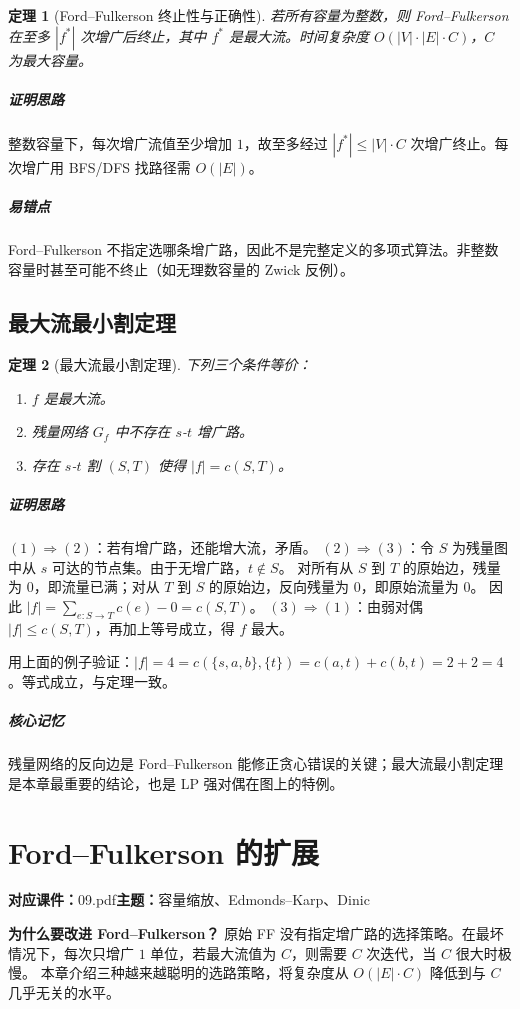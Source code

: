 \documentclass[UTF8,openany,12pt]{ctexbook}
\newtheorem{theorem}{定理}[chapter]
\theoremstyle{remark}
\newcommand{\lecture}[3]{
  \chapter{#2}
  \noindent\textbf{对应课件：}#1\hfill\textbf{主题：}#3
  \vspace{0.6em}
}
\newcommand{\keypoint}[1]{\paragraph{核心记忆}#1}
\newcommand{\proofidea}[1]{\paragraph{证明思路}#1}
\newcommand{\pitfall}[1]{\paragraph{易错点}#1}
\begin{document}
\begin{theorem}[Ford--Fulkerson 终止性与正确性]
若所有容量为整数，则 Ford--Fulkerson 在至多 $|f^*|$ 次增广后终止，其中 $f^*$ 是最大流。时间复杂度 $O(|V|\cdot|E|\cdot C)$，$C$ 为最大容量。
\end{theorem}
\proofidea{整数容量下，每次增广流值至少增加 $1$，故至多经过 $|f^*|\le |V|\cdot C$ 次增广终止。每次增广用 BFS/DFS 找路径需 $O(|E|)$。}

\pitfall{Ford--Fulkerson 不指定选哪条增广路，因此不是完整定义的多项式算法。非整数容量时甚至可能不终止（如无理数容量的 Zwick 反例）。}

\section{最大流最小割定理}

\begin{theorem}[最大流最小割定理]
下列三个条件等价：
\begin{enumerate}
  \item $f$ 是最大流。
  \item 残量网络 $G_f$ 中不存在 $s$-$t$ 增广路。
  \item 存在 $s$-$t$ 割 $(S,T)$ 使得 $|f|=c(S,T)$。
\end{enumerate}
\end{theorem}

\proofidea{
$(1)\Rightarrow(2)$：若有增广路，还能增大流，矛盾。
$(2)\Rightarrow(3)$：令 $S$ 为残量图中从 $s$ 可达的节点集。由于无增广路，$t\notin S$。
对所有从 $S$ 到 $T$ 的原始边，残量为 $0$，即流量已满；对从 $T$ 到 $S$ 的原始边，反向残量为 $0$，即原始流量为 $0$。
因此 $|f|=\sum_{e: S\to T}c(e)-0=c(S,T)$。
$(3)\Rightarrow(1)$：由弱对偶 $|f|\le c(S,T)$，再加上等号成立，得 $f$ 最大。
}

\noindent 用上面的例子验证：$|f|=4=c(\{s,a,b\},\{t\})=c(a,t)+c(b,t)=2+2=4$。等式成立，与定理一致。

\keypoint{残量网络的反向边是 Ford--Fulkerson 能修正贪心错误的关键；最大流最小割定理是本章最重要的结论，也是 LP 强对偶在图上的特例。}


\lecture{09.pdf}{Ford--Fulkerson 的扩展}{容量缩放、Edmonds--Karp、Dinic}

\noindent
\textbf{为什么要改进 Ford--Fulkerson？}
原始 FF 没有指定增广路的选择策略。在最坏情况下，每次只增广 $1$ 单位，若最大流值为 $C$，则需要 $C$ 次迭代，当 $C$ 很大时极慢。
本章介绍三种越来越聪明的选路策略，将复杂度从 $O(|E|\cdot C)$ 降低到与 $C$ 几乎无关的水平。
\end{document}
